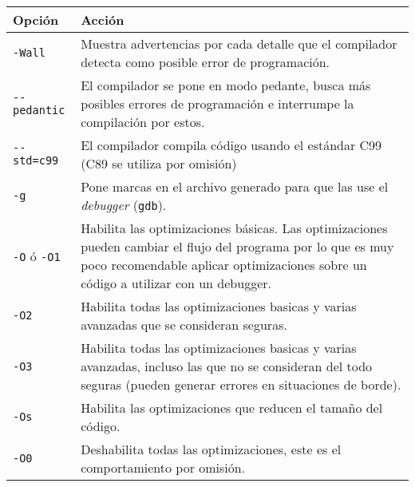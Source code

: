 \begin{center}
\begin{tabular}{lp{10cm}}
Opción & Acción \\
\hline
\lstinline!-Wall! &
 Muestra advertencias por cada detalle que el compilador
 detecta como posible error de programación. \\
\lstinline!--pedantic! &
 El compilador se pone en modo pedante, busca más posibles
 errores de programación e interrumpe la compilación por estos. \\
\lstinline!--std=c99! &
 El compilador compila código usando el estándar C99
 (C89 se utiliza por omisión) \\
\lstinline!-g! &
 Pone marcas en el archivo generado para que las use el
 \textit{debugger} (\verb!gdb!). \\
\lstinline!-O! ó \lstinline!-O1! &
 Habilita las optimizaciones básicas. Las optimizaciones pueden cambiar el
flujo del programa por lo que es muy poco recomendable aplicar optimizaciones
sobre un código a utilizar con un debugger. \\
\lstinline!-O2! &
 Habilita todas las optimizaciones basicas y varias avanzadas que se
consideran seguras. \\
\lstinline!-O3! &
 Habilita todas las optimizaciones basicas y varias avanzadas, incluso las que
no se consideran del todo seguras (pueden generar errores en situaciones de
borde). \\
\lstinline!-Os! &
 Habilita las optimizaciones que reducen el tamaño del código. \\
\lstinline!-O0! &
 Deshabilita todas las optimizaciones, este es el comportamiento por omisión. \\
\end{tabular}
\end{center}

